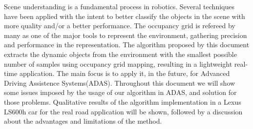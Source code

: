 Scene understanding is a fundamental process in robotics. Several techniques have been applied with the intent to better classify the objects in the scene with more quality and/or a better performance. The occupancy grid is refereed by many as one of the major tools to represent the environment, gathering precision and performance in the representation. The algorithm proposed by this document extracts the dynamic objects from the environment with the smallest possible number of samples using occupancy grid mapping, resulting in a lightweight real-time application. The main focus is to apply it, in the future, for  Advanced Driving Assistence Systems(ADAS). Throughout this document we will show some issues imposed by the usage of our algorithm in ADAS, and solution for those problems. Qualitative results of the algorithm implementation in a Lexus LS600h car for the real road application will be shown, followed by a discussion about the advantages and limitations of the method.



